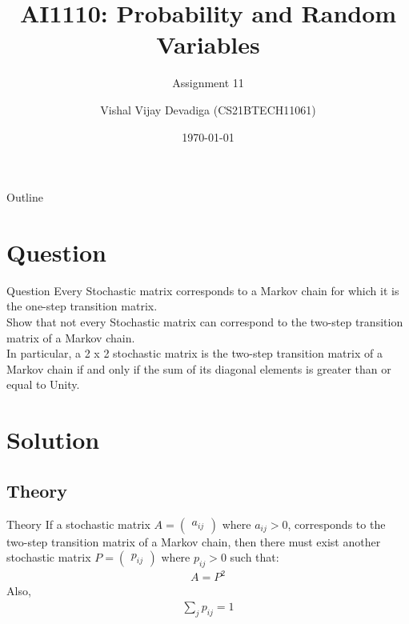 \documentclass{beamer}
\title{AI1110: Probability and Random Variables}
\subtitle{Assignment 11}
\author{Vishal Vijay Devadiga (CS21BTECH11061)}
\date{\today}
\newcommand{\myvec}[1]{\ensuremath{\begin{pmatrix}#1\end{pmatrix}}}
\begin{document}
\begin{frame}
    \titlepage
\end{frame}

\logo{}

\begin{frame}{Outline}
    \tableofcontents
\end{frame}

\section{Question}
\begin{frame}{Question}
    Every Stochastic matrix corresponds to a Markov chain for which it is the one-step transition matrix. \\
    Show that not every Stochastic matrix can correspond to the two-step transition matrix of a Markov chain. \\ 
    In particular, a 2 x 2 stochastic matrix is the two-step transition matrix of a Markov chain if and only if the sum of its diagonal elements is greater than or equal to Unity.
\end{frame}

\section{Solution}
\subsection{Theory}
\begin{frame}{Theory}
    If a stochastic matrix $A =\myvec{a_{ij}}$ where $a_{ij} > 0$, 
    corresponds to the two-step transition matrix of a Markov chain, 
    then there must exist another stochastic matrix $P =\myvec{p_{ij}}$ where $p_{ij} > 0$ 
    such that:
    \begin{align}
        A = P^2
    \end{align}
    Also,
    \begin{align}
        \sum^{ }_{j} p_{ij} = 1
    \end{align}
\end{frame}
\end{document}
